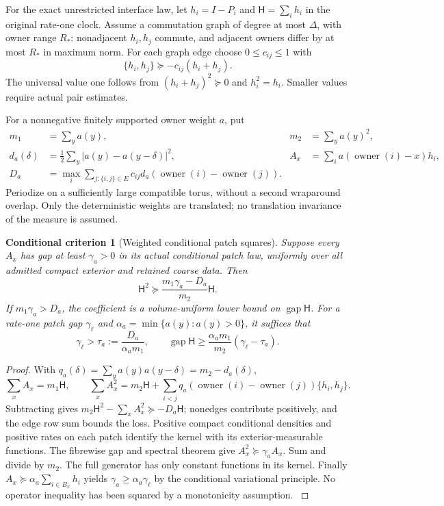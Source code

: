 \documentclass[11pt,oneside,openany]{book}
\newtheorem{criterion}[criterion]{Conditional criterion}
\theoremstyle{definition}
\theoremstyle{remark}
\newcommand{\gap}{\operatorname{gap}}
\newcommand{\src}[2]{\cite[#2]{#1}}
\begin{document}
For the exact unrestricted interface law, let
$h_i=I-P_i$ and $\mathsf H=\sum_i h_i$ in the original rate-one clock.
Assume a commutation graph of degree at most $\Delta$, with owner
range $R_*$: nonadjacent $h_i,h_j$ commute, and adjacent owners differ
by at most $R_*$ in maximum norm. For each graph edge choose
$0\le c_{ij}\le1$ with
\[
 \{h_i,h_j\}\succeq-c_{ij}(h_i+h_j).
\]
The universal value one follows from $(h_i+h_j)^2\succeq0$ and
$h_i^2=h_i$. Smaller values require actual pair estimates.

For a nonnegative finitely supported owner weight $a$, put
\begin{align*}
 m_1&=\sum_y a(y),&m_2&=\sum_y a(y)^2,\\
 d_a(\delta)&=\tfrac12\sum_y|a(y)-a(y-\delta)|^2,
 & A_x&=\sum_i a(\operatorname{owner}(i)-x)h_i,\\
 D_a&=\max_i\sum_{j:\{i,j\}\in E}c_{ij}
               d_a(\operatorname{owner}(i)-\operatorname{owner}(j)).
\end{align*}
Periodize on a sufficiently large compatible torus, without a second
wraparound overlap. Only the deterministic weights are translated;
no translation invariance of the measure is assumed.

\begin{criterion}[Weighted conditional patch squares]
\label{crit:weighted-patches}
Suppose every $A_x$ has gap at least $\gamma_a>0$ in its actual
conditional patch law, uniformly over all admitted compact exterior
and retained coarse data. Then
\begin{equation}\label{eq:weighted-patches}
 \mathsf H^2\succeq\frac{m_1\gamma_a-D_a}{m_2}\mathsf H.
\end{equation}
If $m_1\gamma_a>D_a$, the coefficient is a volume-uniform lower bound
on $\gap\mathsf H$. For a rate-one patch gap $\gamma_\ell$ and
$\alpha_a=\min\{a(y):a(y)>0\}$, it suffices that
\[
 \gamma_\ell>\tau_a:=\frac{D_a}{\alpha_a m_1},\qquad
 \gap\mathsf H\ge\frac{\alpha_a m_1}{m_2}(\gamma_\ell-\tau_a).
\]
\end{criterion}
\begin{proof}
With $q_a(\delta)=\sum_y a(y)a(y-\delta)=m_2-d_a(\delta)$,
\[
 \sum_x A_x=m_1\mathsf H,\qquad
 \sum_x A_x^2=m_2\mathsf H+
       \sum_{i<j}q_a(\operatorname{owner}(i)-\operatorname{owner}(j))
                                                  \{h_i,h_j\}.
\]
Subtracting gives
$m_2\mathsf H^2-\sum_xA_x^2\succeq-D_a\mathsf H$;
nonedges contribute positively, and the edge row sum bounds the loss.
Positive compact conditional densities and positive rates on each
patch identify the kernel with its exterior-measurable functions.
The fibrewise gap and spectral theorem give
$A_x^2\succeq\gamma_a A_x$. Sum and divide by $m_2$.
The full generator has only constant functions in its kernel.
Finally $A_x\succeq\alpha_a\sum_{i\in B_x}h_i$ yields
$\gamma_a\ge\alpha_a\gamma_\ell$ by the conditional variational
principle. No operator inequality has been squared by a monotonicity
assumption. \src{F12}{V63}
\end{proof}
\end{document}
